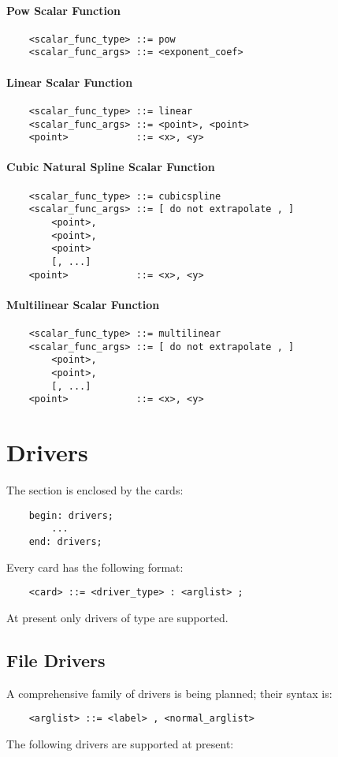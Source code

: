 \subsubsection{Pow Scalar Function}
\begin{verbatim}
    <scalar_func_type> ::= pow
    <scalar_func_args> ::= <exponent_coef>
\end{verbatim}
\subsubsection{Linear Scalar Function}
\begin{verbatim}
    <scalar_func_type> ::= linear
    <scalar_func_args> ::= <point>, <point>
    <point>            ::= <x>, <y>
\end{verbatim}
\subsubsection{Cubic Natural Spline Scalar Function}
\begin{verbatim}
    <scalar_func_type> ::= cubicspline
    <scalar_func_args> ::= [ do not extrapolate , ]
        <point>, 
        <point>, 
        <point>
        [, ...]
    <point>            ::= <x>, <y>
\end{verbatim}
\subsubsection{Multilinear Scalar Function}
\begin{verbatim}
    <scalar_func_type> ::= multilinear
    <scalar_func_args> ::= [ do not extrapolate , ]
        <point>, 
        <point>, 
        [, ...]
    <point>            ::= <x>, <y>
\end{verbatim}


\chapter{Drivers}\label{sec:DRIVERS}
The  section is enclosed by the cards:
\begin{verbatim}
    begin: drivers;
        ...
    end: drivers;
\end{verbatim}
Every  card has the following format:
\begin{verbatim}
    <card> ::= <driver_type> : <arglist> ;
\end{verbatim}
At present only  drivers of type  are supported.

\section{File Drivers}
A comprehensive family of  drivers is being planned;
their syntax is:
\begin{verbatim}
    <arglist> ::= <label> , <normal_arglist>
\end{verbatim}
The following  drivers are supported at present:



